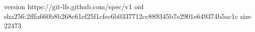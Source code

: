 version https://git-lfs.github.com/spec/v1
oid sha256:2fffa660b8b268c61ef25f1cfec6b0337712cc889345b7e2901e649374b5ac1c
size 22473
